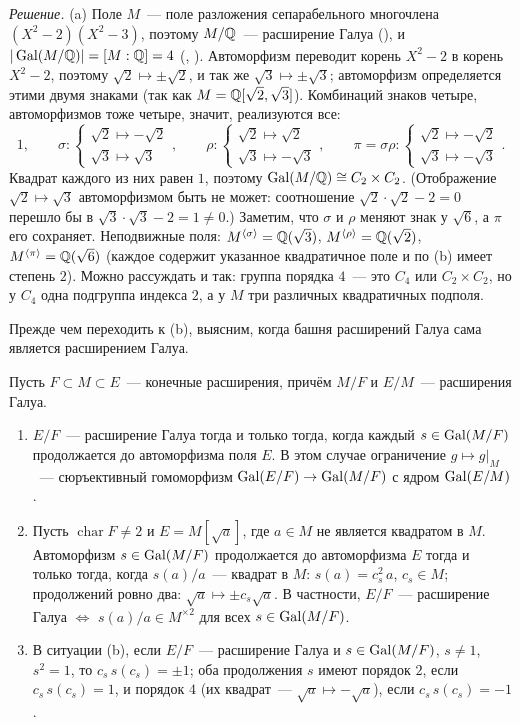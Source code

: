 \medskip\noindent\emph{Решение.} (a) Поле $M$~--- поле разложения сепарабельного многочлена $(X^2-2)(X^2-3)$, поэтому $M/\mathbb Q$~---
расширение Галуа (), и $|\operatorname{Gal}(M/\mathbb Q)|=[M:\mathbb Q]=4$ (, ). Автоморфизм переводит корень $X^2-2$ в корень
$X^2-2$, поэтому $\sqrt2\mapsto\pm\sqrt2$, и так же $\sqrt3\mapsto\pm\sqrt3$; автоморфизм определяется этими двумя знаками
(так как $M=\mathbb Q[\sqrt2,\sqrt3]$). Комбинаций знаков четыре, автоморфизмов тоже четыре, значит, реализуются все:
\[
1,\qquad \sigma\colon\begin{cases}\sqrt2\mapsto-\sqrt2\\ \sqrt3\mapsto\sqrt3\end{cases},\qquad
\rho\colon\begin{cases}\sqrt2\mapsto\sqrt2\\ \sqrt3\mapsto-\sqrt3\end{cases},\qquad
\pi=\sigma\rho\colon\begin{cases}\sqrt2\mapsto-\sqrt2\\ \sqrt3\mapsto-\sqrt3\end{cases}.
\]
Квадрат каждого из них равен $1$, поэтому $\operatorname{Gal}(M/\mathbb Q)\cong C_2\times C_2$. (Отображение $\sqrt2\mapsto\sqrt3$ автоморфизмом быть
не может: соотношение $\sqrt2\cdot\sqrt2-2=0$ перешло бы в $\sqrt3\cdot\sqrt3-2=1\ne0$.) Заметим, что $\sigma$ и $\rho$ меняют
знак у $\sqrt6$, а $\pi$ его сохраняет. Неподвижные поля: $M^{\langle\sigma\rangle}=\mathbb Q(\sqrt3)$, $M^{\langle\rho\rangle}=\mathbb Q(\sqrt2)$,
$M^{\langle\pi\rangle}=\mathbb Q(\sqrt6)$ (каждое содержит указанное квадратичное поле и по (b) имеет степень $2$). Можно
рассуждать и так: группа порядка $4$~--- это $C_4$ или $C_2\times C_2$, но у $C_4$ одна подгруппа индекса $2$, а у $M$ три
различных квадратичных подполя.

Прежде чем переходить к (b), выясним, когда башня расширений Галуа сама является расширением Галуа.

\begin{lemma}[3.30e]
Пусть $F\subset M\subset E$~--- конечные расширения, причём $M/F$ и $E/M$~--- расширения Галуа.
\begin{enumerate}[label=\textup{(\alph*)}]
\item $E/F$~--- расширение Галуа тогда и только тогда, когда каждый $s\in\operatorname{Gal}(M/F)$ продолжается до автоморфизма поля
$E$. В этом случае ограничение $g\mapsto g|_M$~--- сюръективный гомоморфизм $\operatorname{Gal}(E/F)\to\operatorname{Gal}(M/F)$ с ядром $\operatorname{Gal}(E/M)$.
\item Пусть $\operatorname{char}F\ne2$ и $E=M[\sqrt a]$, где $a\in M$ не является квадратом в $M$. Автоморфизм
$s\in\operatorname{Gal}(M/F)$ продолжается до автоморфизма $E$ тогда и только тогда, когда $s(a)/a$~--- квадрат в $M$:
$s(a)=c_s^2\,a$, $c_s\in M$; продолжений ровно два: $\sqrt a\mapsto\pm c_s\sqrt a$. В частности, $E/F$~--- расширение
Галуа $\iff$ $s(a)/a\in M^{\times2}$ для всех $s\in\operatorname{Gal}(M/F)$.
\item В ситуации (b), если $E/F$~--- расширение Галуа и $s\in\operatorname{Gal}(M/F)$, $s\ne1$, $s^2=1$, то $c_s\,s(c_s)=\pm1$; оба
продолжения $s$ имеют порядок $2$, если $c_s\,s(c_s)=1$, и порядок $4$ (их квадрат~--- $\sqrt a\mapsto-\sqrt a$), если
$c_s\,s(c_s)=-1$.
\end{enumerate}
\end{lemma}


